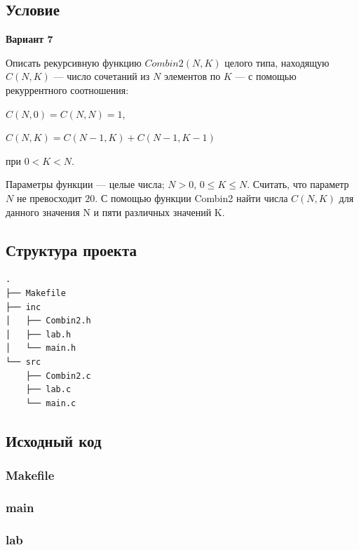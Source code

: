 \documentclass[12pt, a4paper]{article}
\begin{document}
\subsection{Условие}

\begin{center}
    \textbf{Вариант 7}
\end{center}

Описать рекурсивную функцию $Combin2(N, K)$ целого типа, находящую $C(N, K)$ — число сочетаний из $N$ элементов по $K$ — с помощью рекуррентного соотношения:

$C(N, 0) = C(N, N) = 1$,

$C(N, K) = C(N - 1, K) + C(N - 1, K - 1)$

при $0 < K < N$.

Параметры функции — целые числа; $N > 0$, $0 \leq K \leq N$. Считать, что параметр $N$ не превосходит $20$. С помощью функции Combin2 найти числа $C(N, K)$ для данного значения N и пяти различных значений K.

\subsection{Структура проекта}

\begin{verbatim}
.
├── Makefile
├── inc
│   ├── Combin2.h
│   ├── lab.h
│   └── main.h
└── src
    ├── Combin2.c
    ├── lab.c
    └── main.c
\end{verbatim}

\subsection{Исходный код}

\subsubsection{Makefile}


\subsubsection{main}



\subsubsection{lab}


\end{document}
